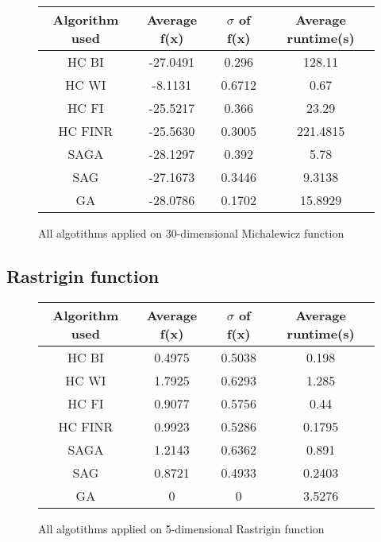 \documentclass{article}
\begin{document}
\begin{figure}[H]
	\begin{tabular}{|c||c|c|c|} \hline
		Algorithm used & Average f(x) & $\sigma$ of f(x) & Average runtime(s) \\ \hline \hline
		HC BI & -27.0491 & 0.296 & 128.11 \\ \hline
		HC WI & -8.1131 & 0.6712 & 0.67 \\ \hline
		HC FI & -25.5217 & 0.366 & 23.29 \\ \hline
		HC FINR & -25.5630 & 0.3005 & 221.4815 \\ \hline
		SAGA & -28.1297 & 0.392 & 5.78 \\ \hline
		SAG & -27.1673 & 0.3446 & 9.3138 \\ \hline
        GA & -28.0786 & 0.1702 & 15.8929 \\ \hline
\end{tabular}
\caption{All algotithms applied on 30-dimensional Michalewicz function}
\end{figure}

\subsection{Rastrigin function}

\begin{figure}[H]
	\begin{tabular}{|c||c|c|c|} \hline
		Algorithm used & Average f(x) & $\sigma$ of f(x) & Average runtime(s) \\ \hline \hline
		HC BI & 0.4975 & 0.5038 & 0.198 \\ \hline
		HC WI & 1.7925 & 0.6293 & 1.285 \\ \hline
		HC FI & 0.9077 & 0.5756 & 0.44 \\ \hline
		HC FINR & 0.9923 & 0.5286 & 0.1795 \\ \hline
		SAGA & 1.2143 & 0.6362 & 0.891 \\ \hline
		SAG & 0.8721 & 0.4933 & 0.2403 \\ \hline
        GA & 0 & 0 & 3.5276 \\ \hline
\end{tabular}
\caption{All algotithms applied on 5-dimensional Rastrigin function}
\end{figure}
\end{document}
